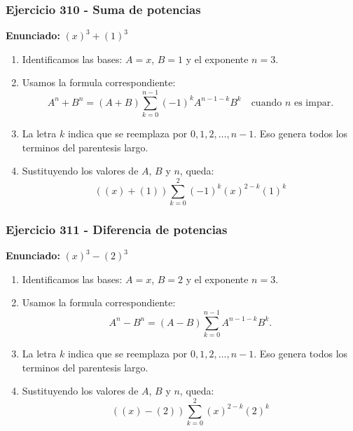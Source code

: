 \documentclass[11pt,a4paper]{article}
\begin{document}
\subsubsection*{Ejercicio 310 - Suma de potencias}
\textbf{Enunciado:} $ \left(x\right)^{3}+\left(1\right)^{3} $\par
\begin{enumerate}[leftmargin=2em]
\item Identificamos las bases: \(A=x\), \(B=1\) y el exponente \(n=3\).
\item Usamos la formula correspondiente: \[A^n+B^n=(A+B)\sum_{k=0}^{n-1}(-1)^kA^{n-1-k}B^k\quad\text{cuando }n\text{ es impar}.\]
\item La letra \(k\) indica que se reemplaza por \(0,1,2,\ldots,n-1\). Eso genera todos los terminos del parentesis largo.
\item Sustituyendo los valores de \(A\), \(B\) y \(n\), queda: \[\boxed{\left(\left(x\right)+\left(1\right)\right)\sum_{k=0}^{2}(-1)^k\left(x\right)^{2-k}\left(1\right)^k}\]
\end{enumerate}

\vspace{0.2cm}
\subsubsection*{Ejercicio 311 - Diferencia de potencias}
\textbf{Enunciado:} $ \left(x\right)^{3}-\left(2\right)^{3} $\par
\begin{enumerate}[leftmargin=2em]
\item Identificamos las bases: \(A=x\), \(B=2\) y el exponente \(n=3\).
\item Usamos la formula correspondiente: \[A^n-B^n=(A-B)\sum_{k=0}^{n-1}A^{n-1-k}B^k.\]
\item La letra \(k\) indica que se reemplaza por \(0,1,2,\ldots,n-1\). Eso genera todos los terminos del parentesis largo.
\item Sustituyendo los valores de \(A\), \(B\) y \(n\), queda: \[\boxed{\left(\left(x\right)-\left(2\right)\right)\sum_{k=0}^{2}\left(x\right)^{2-k}\left(2\right)^k}\]
\end{enumerate}

\vspace{0.2cm}
\end{document}
